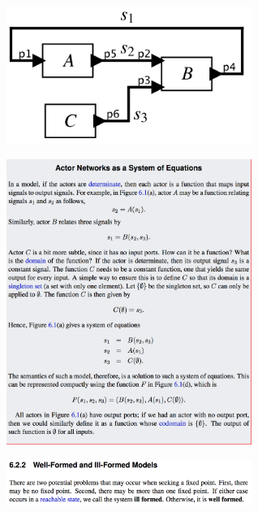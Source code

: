 \documentclass[10pt,landscape]{article}
\begin{document}
\begin{multicols}{3}
\begin{center}
\includegraphics*[width = 8cm]{Fig9.png}\\
\end{center}

\begin{center}
\includegraphics*[width = 8cm]{Fig10.png}\\
\end{center}

\begin{center}
\includegraphics*[width = 8cm]{Fig11.png}\\
\end{center}


\end{multicols}
\end{document}
